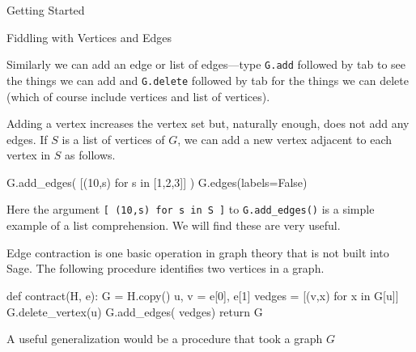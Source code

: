 \begin{chap}{Getting Started}
\begin{sect}{Fiddling with Vertices and Edges}
\begin{sagecode}
\begin{sageoutput}
[(0, 2), (0, 8), (1, 2), (1, 3), 
(1, 8), (2, 3), (3, 4), (3, 5), 
(4, 5), (4, 6), (5, 6), (5, 7), 
(6, 7), (6, 8), (7, 8)]
\end{sageoutput}
\end{sagecode}
%
\begin{para}
Similarly we can add an edge or list of edges---type \verb|G.add|
followed by tab to see the things we can add and \verb|G.delete|
followed by tab for the things we can delete (which of course include
vertices and list of vertices).
\end{para}
%
\begin{para}
Adding a vertex increases the vertex set but, naturally enough, does
not add any edges.
If $S$ is a list of vertices of $G$, we can add a new vertex adjacent to 
each vertex in $S$ as follows.
\end{para}
%
\begin{sagecode}
\begin{sageinput}
G.add_edges( [(10,s) for s in [1,2,3]] )
G.edges(labels=False)
\end{sageinput}
\begin{sageoutput}
[(0, 2), (0, 8), (1, 2), (1, 3), 
(1, 8), (1, 10), (2, 3), (2, 10), 
(3, 4), (3, 5), (3, 10), (4, 5), 
(4, 6), (5, 6), (5, 7), (6, 7), 
(6, 8), (7, 8)]
\end{sageoutput}
\end{sagecode}
%
\begin{para}
Here the argument \verb|[ (10,s) for s in S ]| to \verb|G.add_edges()| 
is a simple example of a list comprehension.  
We will find these are very useful.
\end{para}
%
\begin{para}
Edge contraction is one basic operation in graph theory that is not built 
into Sage.  The following procedure identifies two vertices in a graph.
\end{para}
%
\begin{sagecode}
\begin{sageinput}
def contract(H, e):
    G = H.copy() 
    u, v = e[0], e[1]
    vedges = [(v,x) for x in G[u]]  
    G.delete_vertex(u)
    G.add_edges( vedges)
    return G
\end{sageinput}
\begin{sageoutput}
\end{sageoutput}
\end{sagecode}
%
\begin{para}
A useful generalization would be a procedure that took a graph $G$

\end{para}
\end{sect}
\end{chap}
